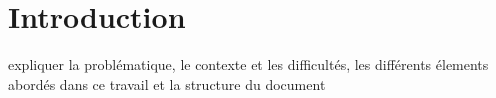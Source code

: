 \chapter{Introduction}

expliquer la problématique, le contexte et les difficultés, les différents élements abordés dans ce travail et la structure du document
